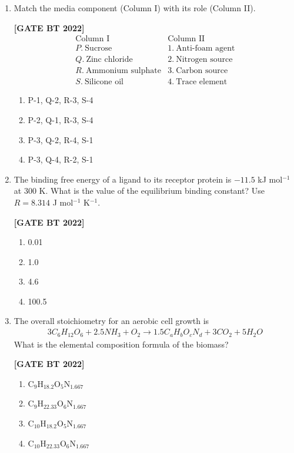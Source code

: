 \documentclass[12pt]{article}
\begin{document}
\begin{enumerate}[leftmargin=2.5em, label=\textbf{Q.\arabic*}., itemsep=2em, resume]
\item Match the media component (Column I) with its role (Column II).

\noindent \textbf{[GATE BT 2022]}
\[
\begin{array}{ll}
\text{Column I} & \text{Column II} \\
P. \ \text{Sucrose} & 1. \ \text{Anti-foam agent} \\
Q. \ \text{Zinc chloride} & 2. \ \text{Nitrogen source} \\
R. \ \text{Ammonium sulphate} & 3. \ \text{Carbon source} \\
S. \ \text{Silicone oil} & 4. \ \text{Trace element}
\end{array}
\]
\begin{multicols}{2}
\begin{enumerate}
    \item P-1, Q-2, R-3, S-4
    \item P-2, Q-1, R-3, S-4
    \item P-3, Q-2, R-4, S-1
    \item P-3, Q-4, R-2, S-1
\end{enumerate}
\end{multicols}

\item The binding free energy of a ligand to its receptor protein is $-11.5$ kJ mol$^{-1}$ at 300 K. What is the value of the equilibrium binding constant? Use $R = 8.314$ J mol$^{-1}$ K$^{-1}$.

\noindent \textbf{[GATE BT 2022]}
\begin{multicols}{2}
\begin{enumerate}
    \item 0.01
    \item 1.0
    \item 4.6
    \item 100.5
\end{enumerate}
\end{multicols}

\item The overall stoichiometry for an aerobic cell growth is
\begin{align*}
3C_6H_{12}O_6 + 2.5NH_3 + O_2 \rightarrow 1.5C_aH_bO_cN_d + 3CO_2 + 5H_2O
\end{align*}
What is the elemental composition formula of the biomass?

\noindent \textbf{[GATE BT 2022]}
\begin{multicols}{2}
\begin{enumerate}
    \item C$_9$H$_{18.2}$O$_5$N$_{1.667}$
    \item C$_9$H$_{22.33}$O$_6$N$_{1.667}$
    \item C$_{10}$H$_{18.2}$O$_5$N$_{1.667}$
    \item C$_{10}$H$_{22.33}$O$_6$N$_{1.667}$
\end{enumerate}
\end{multicols}


\end{enumerate}
\end{document}
